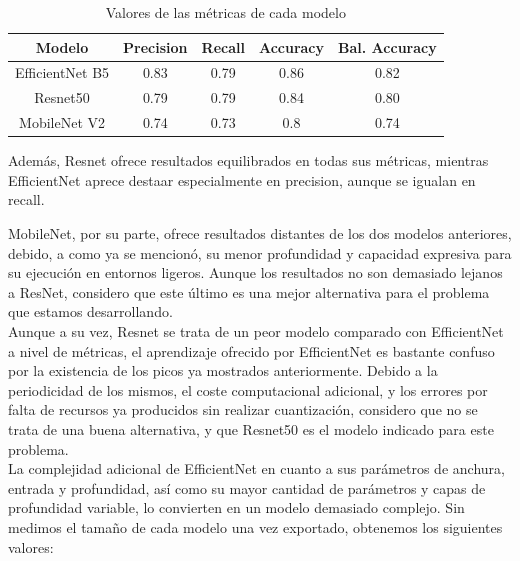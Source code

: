 \begin{table}[H]
	\centering
	\begin{tabular}{|c|c|c|c|c|}
		\hline
		\textbf{Modelo} & \textbf{Precision} & \textbf{Recall} & \textbf{Accuracy} & \textbf{Bal. Accuracy} \\ \hline
		EfficientNet B5 & 0.83 & 0.79 & 0.86 & 0.82 \\ \hline
		Resnet50 & 0.79 & 0.79 & 0.84 & 0.80 \\ \hline
		MobileNet V2 & 0.74 & 0.73 & 0.8 & 0.74 \\ \hline
	\end{tabular}
	\caption{Valores de las métricas de cada modelo}
	\label {fig:metricas}
\end{table}

Además, Resnet ofrece resultados equilibrados en todas sus métricas, mientras EfficientNet aprece destaar especialmente en precision, aunque se igualan en recall.

MobileNet, por su parte, ofrece resultados distantes de los dos modelos anteriores, debido, a como ya se mencionó, su menor profundidad y capacidad expresiva para su ejecución en entornos ligeros. Aunque los resultados no son demasiado lejanos a ResNet, considero que este último es una mejor alternativa para el problema que estamos desarrollando.\\

Aunque a su vez, Resnet se trata de un peor modelo comparado con EfficientNet a nivel de métricas, el aprendizaje ofrecido por EfficientNet es bastante confuso por la existencia de los picos ya mostrados anteriormente. Debido a la periodicidad de los mismos, el coste computacional adicional, y los errores por falta de recursos ya producidos sin realizar cuantización, considero que no se trata de una buena alternativa, y que Resnet50 es el modelo indicado para este problema.\\

La complejidad adicional de EfficientNet en cuanto a sus parámetros de anchura, entrada y profundidad, así como su mayor cantidad de parámetros y capas de profundidad variable, lo convierten en un modelo demasiado complejo. Sin medimos el tamaño de cada modelo una vez exportado, obtenemos los siguientes valores: 

